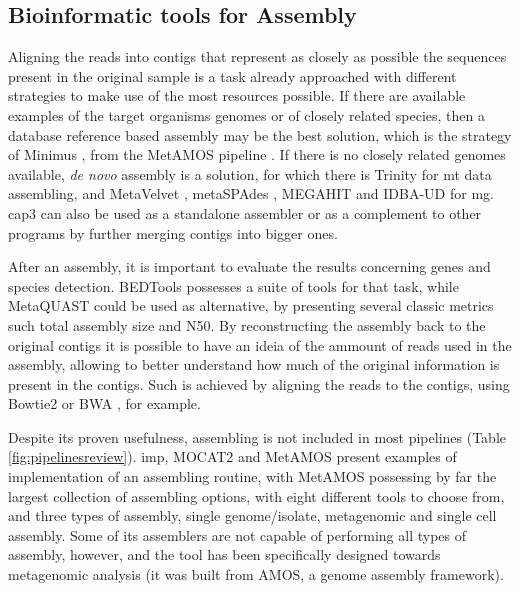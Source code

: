 \documentclass[
  oneside,
  11pt, a4paper,
  footinclude=true,
  headinclude=true,
  cleardoublepage=empty
]{scrbook}
\begin{document}
    \subsection{Bioinformatic tools for Assembly}
    
    Aligning the reads into contigs that represent as closely as possible the sequences present in the original sample is a task already approached with different strategies to make use of the most resources possible. If there are available examples of the target organisms genomes or of closely related species, then a database reference based assembly may be the best solution, which is the strategy of Minimus \citep{sommer2007minimus}, from the MetAMOS pipeline \citep{treangen2013metamos}. If there is no closely related genomes available, \textit{de novo} assembly is a solution, for which there is Trinity \citep{Celaj2014} for \gls{mt} data assembling, and MetaVelvet \citep{namiki2012metavelvet}, metaSPAdes \citep{nurk2016metaspades}, MEGAHIT \citep{li2015megahit} and IDBA-UD \citep{peng2012idba} for \gls{mg}. cap3 \citep{huang1999cap3} can also be used as a standalone assembler or as a complement to other programs by further merging contigs into bigger ones.
    
    After an assembly, it is important to evaluate the results concerning genes and species detection. BEDTools \citep{quinlan2010bedtools} possesses a suite of tools for that task, while MetaQUAST \citep{mikheenko2016metaquast} could be used as alternative, by presenting several classic metrics such total assembly size and N50. By reconstructing the assembly back to the original contigs it is possible to have an ideia of the ammount of reads used in the assembly, allowing to better understand how much of the original information is present in the contigs. Such is achieved by aligning the reads to the contigs, using Bowtie2 \citep{langmead2012fast} or BWA \citep{doi:10.1093/bioinformatics/btp324}, for example.
    
    Despite its proven usefulness, assembling is not included in most pipelines (Table \ref{fig:pipelinesreview}). \gls{imp}, MOCAT2 and MetAMOS present examples of implementation of an assembling routine, with MetAMOS possessing by far the largest collection of assembling options, with eight different tools to choose from, and three types of assembly, single genome/isolate, metagenomic and single cell assembly. Some of its assemblers are not capable of performing all types of assembly, however, and the tool has been specifically designed towards metagenomic analysis (it was built from AMOS, a genome assembly framework). 
\end{document}
